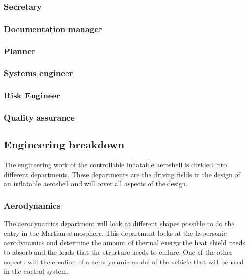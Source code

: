 \subsubsection{Secretary}\label{subsec:Secretary}


\subsubsection{Documentation manager}\label{subsec:D_and_A}


\subsubsection{Planner}\label{subsec:Planner}


\subsubsection{Systems engineer}\label{subsec:SE}


\subsubsection{Risk Engineer}\label{subsec:RiskEng}


\subsubsection{Quality assurance}\label{subsec:QA}


\subsection{Engineering breakdown}\label{subsec:engineer}
The engineering work of the controllable inflatable aeroshell is divided into different departments. These departments are the driving fields in the design of an inflatable aeroshell and will cover all aspects of the design.

\subsubsection{Aerodynamics}\label{subsec:aero}
The aerodynamics department will look at different shapes possible to do the entry in the Martian atmosphere. This department looks at the hypersonic aerodynamics and determine the amount of thermal energy the heat shield needs to absorb and the loads that the structure needs to endure. One of the other aspects will the creation of a aerodynamic model of the vehicle that will be used in the control system.

